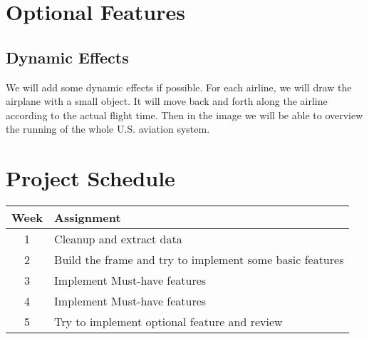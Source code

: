 \documentclass[12pt]{article}
\begin{document}
\section{Optional Features}
    \subsection{Dynamic Effects}
    We will add some dynamic effects if possible. For each airline, we will draw the airplane with a small object. It will move back and forth along the airline according to the actual flight time. Then in the image we will be able to overview the running of the whole U.S. aviation system.
\section{Project Schedule}
\begin{table}[H]
\center
  \begin{tabular}{c|l}
  \hline
  Week & Assignment\\
  \hline
  1 & Cleanup and extract data\\
  2 & Build the frame and try to implement some basic features \\
  3 & Implement Must-have features \\
  4 & Implement Must-have features \\
  5 & Try to implement optional feature and review\\
  \hline
\end{tabular}
\end{table}





\newpage
\renewcommand\refname{Reference}


\end{document}
